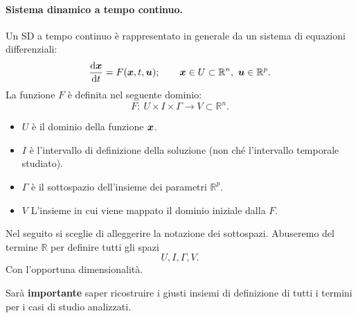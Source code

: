 \paragraph{Sistema dinamico a tempo continuo.}%
\label{par:Sistema dinamico a tempo continuo.}
Un SD a tempo continuo è rappresentato in generale da un sistema di equazioni differenziali:
\[
    \frac{\text{d} \boldsymbol{x}}{\text{d} t} = F(\boldsymbol{x}, t, \boldsymbol{u});
    \qquad 
    \boldsymbol{x}\in U \subset \mathbb{R}^n, \ \boldsymbol{u}  \in \mathbb{R}^p
.\] 
La funzione $F$ è definita nel seguente dominio:
\[
    F: \ U \times I \times \Gamma  \to V \subset \mathbb{R}^n
.\] 
\begin{itemize}
    \item $U$ è il dominio della funzione $\boldsymbol{x}$.
    \item $I$ è l'intervallo di definizione della soluzione (non ché l'intervallo temporale studiato).
    \item $\Gamma$ è il sottospazio dell'insieme dei parametri $\mathbb{R}^p$.
    \item $V$ L'insieme in cui viene mappato il dominio iniziale dalla $F$.
\end{itemize}
\begin{defn}
    Nel seguito si sceglie di alleggerire la notazione dei sottospazi. Abuseremo del termine $\mathbb{R}$ per definire tutti gli spazi
    \[
        U, I, \Gamma, V
    .\] 
    Con l'opportuna dimensionalità.
\end{defn}
\noindent
Sarà \textbf{importante} saper ricostruire i giusti insiemi di definizione di tutti i termini per i casi di studio analizzati.
